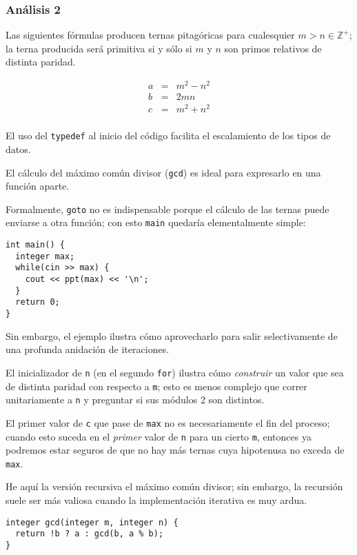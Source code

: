 \documentclass[10pt,letterpaper,twocolumn,spanish]{article}
\begin{document}
\subsubsection*{Análisis 2}

Las siguientes fórmulas producen ternas pitagóricas para cualesquier $m > n \in \mathbb{Z}^+$; la terna producida será primitiva si y sólo si $m$ y $n$ son primos relativos de distinta paridad.

\begin{eqnarray*}
a & = & m^2 - n^2 \\
b & = & 2mn \\
c & = & m^2 + n^2 \\
\end{eqnarray*}

\begin{compactitem}
\item
El uso del \texttt{typedef} al inicio del código facilita el escalamiento de los tipos de datos.
\item
El cálculo del máximo común divisor (\texttt{gcd}) es ideal para expresarlo en una función aparte.
\item
Formalmente, \texttt{goto} no es indispensable porque el cálculo de las ternas puede enviarse a otra función; con esto \texttt{main} quedaría elementalmente simple:
\begin{verbatim}
int main() {
  integer max;
  while(cin >> max) {
    cout << ppt(max) << '\n';
  }
  return 0;
}
\end{verbatim}
Sin embargo, el ejemplo ilustra cómo aprovecharlo para salir selectivamente de una profunda anidación de iteraciones.
\item
El inicializador de \texttt{n} (en el segundo \texttt{for}) ilustra cómo \textit{construir} un valor que sea de distinta paridad con respecto a \texttt{m}; esto es menos complejo que correr unitariamente a \texttt{n} y preguntar si sus módulos 2 son distintos.
\item
El primer valor de \texttt{c} que pase de \texttt{max} no es necesariamente el fin del proceso; cuando esto suceda en el \textit{primer} valor de \texttt{n} para un cierto \texttt{m}, entonces ya podremos estar seguros de que no hay más ternas cuya hipotenusa no exceda de \texttt{max}.
\item
He aquí la versión recursiva el máximo común divisor; sin embargo, la recursión suele ser más valiosa cuando la implementación iterativa es muy ardua.

\begin{verbatim}
integer gcd(integer m, integer n) {
  return !b ? a : gcd(b, a % b);
}
\end{verbatim}
\end{compactitem}
\end{document}
